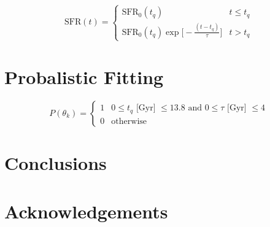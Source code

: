 \documentclass[a4paper,fleqn,usenatbib]{mnras}
\begin{document}
   \begin{equation}
      \text{SFR}(t) = \begin{cases}
                \text{SFR}_{0}(t_{q}) & t \leq t_{q} \\
                \text{SFR}_{0}(t_{q})\exp\bigg[-\frac{(t-t_{q})}{\tau}\bigg] & t > t_{q} 
               \end{cases}
       \label{eq:model}
   \end{equation}

\section{Probalistic Fitting}


   \begin{equation}
      P(\theta_{k}) = \begin{cases}
                       1 & 0\leq t_{q}\text{ [Gyr] } \leq 13.8 \text{ and }  0 \leq \tau\text{ [Gyr] } \leq 4 \\
                       0 & \text{otherwise}
                      \end{cases}
      \label{eq:prior}
   \end{equation}

\section{Conclusions}

\section*{Acknowledgements}










\appendix




\bsp	%
\label{lastpage}
\end{document}
